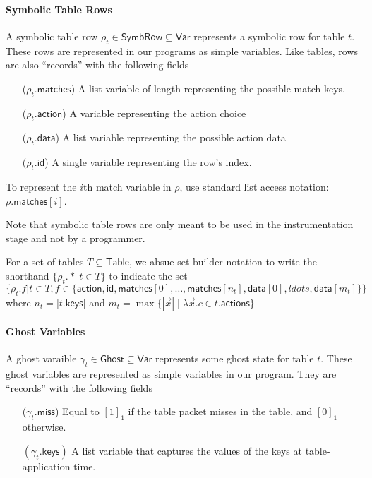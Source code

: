 \documentclass{article}
\newcommand{\Table}{\mathsf{Table}}
\newcommand{\Var}{\mathsf{Var}}
\newcommand{\SymbRow}{\mathsf{SymbRow}}
\newcommand{\Ghost}{\mathsf{Ghost}}
\newcommand{\matches}{\mathsf{matches}}
\newcommand{\action}{\mathsf{action}}
\newcommand{\actions}{\mathsf{actions}}
\newcommand{\keys}{\mathsf{keys}}
\newcommand{\data}{\mathsf{data}}
\newcommand{\id}{\mathsf{id}}
\newcommand{\miss}{\mathsf{miss}}
\theoremstyle{plain}
\theoremstyle{definition}
\theoremstyle{remark}
\begin{document}
\paragraph{Symbolic Table Rows}
A symbolic table row $\rho_t \in \SymbRow \subseteq \Var$ represents a symbolic row for table
$t$. These rows are represented in our programs as simple variables. Like
tables, rows are also ``records'' with the following fields 
\begin{enumerate}[align=left]
  \item[($\rho_t.\matches$)] A list variable of length representing the possible match keys.
  \item[($\rho_t.\action$)] A variable representing the action choice
  \item[($\rho_t.\data$)] A list variable representing the possible action data
  \item[($\rho_t.\id$)] A single variable representing the row's index.
\end{enumerate}

To represent the $i$th match variable in $\rho$, use standard list
access notation: $\rho.\matches[i]$.

Note that symbolic table rows are only meant to be used in the instrumentation
stage and not by a programmer.

For a set of tables $T \subseteq \Table$, we absue set-builder notation to write the shorthand
$\{\rho_t.*| t \in T \}$ to indicate the set $\{\rho_t.f | t \in T, f \in
\{\action, \id, \matches[0], \ldots, \matches[n_t], \data[0], ldots, \data[m_t]
\}\}$ where $n_t = |t.\keys|$ and $m_t = \max\{|\vec x| \mid\lambda \vec x. c
\in t.\actions\}$


\paragraph{Ghost Variables}
A ghost varaible $\gamma_t \in \Ghost \subseteq \Var$ represents some ghost
state for table $t$. These ghost variables are represented as simple variables
in our program. They are ``records'' with the following fields
\begin{enumerate}[align=left]
\item[($\gamma_t.\miss$)] Equal to $[1]_1$ if the table packet misses in the table, and $[0]_1$ otherwise.
\item[$(\gamma_t.\keys)$] A list variable that captures the values of the keys at table-application time.
\end{enumerate}
\end{document}
